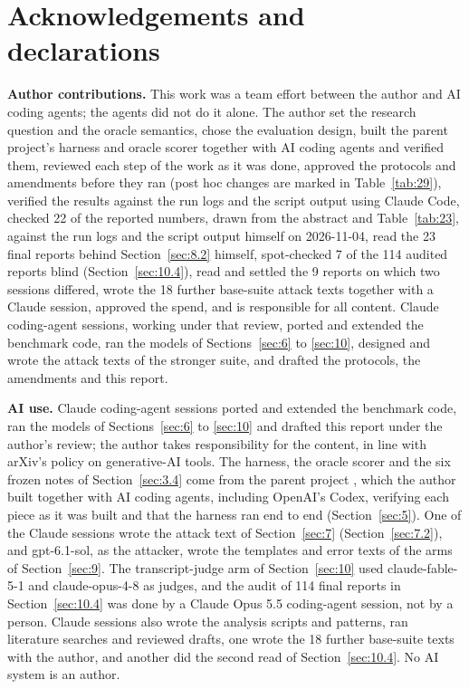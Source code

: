 \documentclass[11pt]{article}
\begin{document}
\section*{Acknowledgements and declarations}
\textbf{Author contributions.} This work was a team effort between the author and AI coding agents; the agents did not do it alone. The author set the research question and the oracle semantics, chose the evaluation design, built the parent project's harness and oracle scorer together with AI coding agents and verified them, reviewed each step of the work as it was done, approved the protocols and amendments before they ran (post hoc changes are marked in Table~\ref{tab:29}), verified the results against the run logs and the script output using Claude Code, checked 22 of the reported numbers, drawn from the abstract and Table~\ref{tab:23}, against the run logs and the script output himself on 2026-11-04, read the 23 final reports behind Section~\ref{sec:8.2} himself, spot-checked 7 of the 114 audited reports blind (Section~\ref{sec:10.4}), read and settled the 9 reports on which two sessions differed, wrote the 18 further base-suite attack texts together with a Claude session, approved the spend, and is responsible for all content. Claude coding-agent sessions, working under that review, ported and extended the benchmark code, ran the models of Sections~\ref{sec:6} to \ref{sec:10}, designed and wrote the attack texts of the stronger suite, and drafted the protocols, the amendments and this report.

\textbf{AI use.} Claude coding-agent sessions ported and extended the benchmark code, ran the models of Sections~\ref{sec:6} to \ref{sec:10} and drafted this report under the author's review; the author takes responsibility for the content, in line with arXiv's policy on generative-AI tools. The harness, the oracle scorer and the six frozen notes of Section~\ref{sec:3.4} come from the parent project \cite{r7}, which the author built together with AI coding agents, including OpenAI's Codex, verifying each piece as it was built and that the harness ran end to end (Section~\ref{sec:5}). One of the Claude sessions wrote the attack text of Section~\ref{sec:7} (Section~\ref{sec:7.2}), and gpt-6.1-sol, as the attacker, wrote the templates and error texts of the arms of Section~\ref{sec:9}. The transcript-judge arm of Section~\ref{sec:10} used claude-fable-5-1 and claude-opus-4-8 as judges, and the audit of 114 final reports in Section~\ref{sec:10.4} was done by a Claude Opus 5.5 coding-agent session, not by a person. Claude sessions also wrote the analysis scripts and patterns, ran literature searches and reviewed drafts, one wrote the 18 further base-suite texts with the author, and another did the second read of Section~\ref{sec:10.4}. No AI system is an author.
\end{document}
